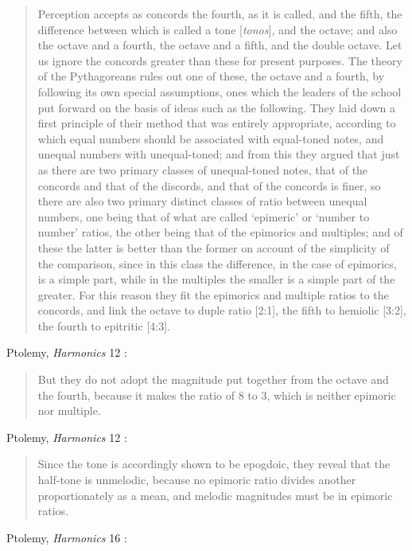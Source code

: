 \documentclass{article}
\theoremstyle{definition}
\begin{document}
\begin{quote}
Perception accepts as concords the fourth, as it is called, and the fifth, the
difference between which is called a tone [{\em tonos}], and the octave; and also the
octave and a fourth, the octave and a fifth, and the double octave. Let us ignore
the concords greater than these for present purposes. The theory of the
Pythagoreans rules out one of these, the octave and a fourth, by following its
own special assumptions, ones which the leaders of the school put forward on
the basis of ideas such as the following. They laid down a first principle of their
method that was entirely appropriate, according to which equal numbers
should be associated with equal-toned notes, and unequal numbers with
unequal-toned; and from this they argued that just as there are two primary
classes of unequal-toned notes, that of the concords and that of the discords,
and that of the concords is finer, so there are also two primary distinct classes
of ratio between unequal numbers, one being that of what are called `epimeric'
or `number to number' ratios, the other being that of the epimorics and
multiples; and of these the latter is better than the former on account of the
simplicity of the comparison, since in this class the difference, in the case of
epimorics, is a simple part, while in the multiples the smaller is a simple part
of the greater. For this reason they fit the epimorics and multiple ratios to the
concords, and link the octave to duple ratio [2:1], the fifth to hemiolic [3:2],
the fourth to epitritic [4:3].
\end{quote}

Ptolemy, {\em Harmonics} 12 \cite[p.~285]{barker}:

\begin{quote}
But they do not adopt the magnitude put together from
the octave and the fourth, because it makes the ratio of 8 to 3, which is neither
epimoric nor multiple.
\end{quote}

Ptolemy, {\em Harmonics} 12 \cite[p.~286]{barker}:

\begin{quote}
Since the tone is accordingly shown to be
epogdoic, they reveal that the half-tone is unmelodic, because no epimoric ratio
divides another proportionately as a mean, and melodic magnitudes must be in
epimoric ratios.
\end{quote}

Ptolemy, {\em Harmonics} 16 \cite[p.~290]{barker}:
\end{document}
